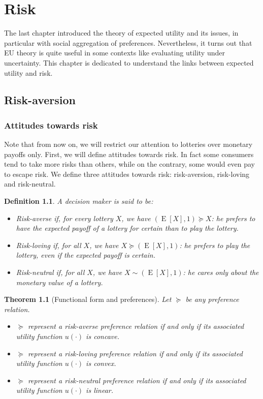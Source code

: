 \documentclass[12pt]{report}
\newtheorem{theorem}{Theorem}[chapter]
\newtheorem{definition}{Definition}[chapter]
\newcommand{\E}[1]{\operatorname{E}\left[#1\right]}
\begin{document}
\chapter{Risk}

The last chapter introduced the theory of expected utility and its issues, in particular with social aggregation of preferences. Nevertheless, it turns out that EU theory is quite useful in some contexts like evaluating utility under uncertainty. This chapter is dedicated to understand the links between expected utility and risk.

\section{Risk-aversion}

\subsection{Attitudes towards risk}

Note that from now on, we will restrict our attention to lotteries over monetary payoffs only. First, we will define attitudes towards risk. In fact some consumers tend to take more risks than others, while on the contrary, some would even pay to escape risk. We define three attitudes towards risk: risk-aversion, risk-loving and risk-neutral.

\begin{definition}
A decision maker is said to be:\begin{itemize}
\item Risk-averse if, for every lottery $X$, we have $(\E{X},1) \succeq X$: he prefers to have the expected payoff of a lottery for certain than to play the lottery.
\item Risk-loving if, for all $X$, we have $X \succeq (\E{X},1)$: he prefers to play the lottery, even if the expected payoff is certain.
\item Risk-neutral if, for all $X$, we have $X \sim (\E{X},1)$: he cares only about the monetary value of a lottery.
\end{itemize} 
\end{definition}

\begin{theorem}[Functional form and preferences]
Let $\succeq$ be any preference relation. \begin{itemize}
\item $\succeq$ represent a risk-averse preference relation if and only if its associated utility function $u(\cdot)$ is concave.
\item $\succeq$ represent a risk-loving preference relation if and only if its associated utility function $u(\cdot)$ is convex.
\item $\succeq$ represent a risk-neutral preference relation if and only if its associated utility function $u(\cdot)$ is linear.
\end{itemize}
\end{theorem}
\end{document}
